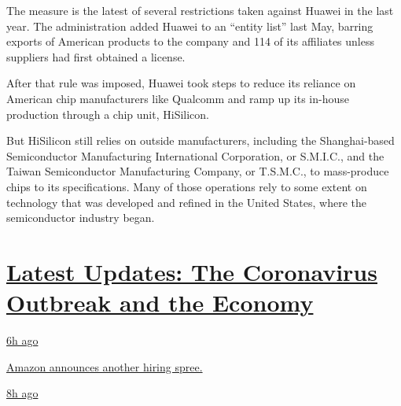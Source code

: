 The measure is the latest of several restrictions taken against Huawei
in the last year. The administration added Huawei to an ``entity list''
last May, barring exports of American products to the company and 114 of
its affiliates unless suppliers had first obtained a license.

After that rule was imposed, Huawei took steps to reduce its reliance on
American chip manufacturers like Qualcomm and ramp up its in-house
production through a chip unit, HiSilicon.

But HiSilicon still relies on outside manufacturers, including the
Shanghai-based Semiconductor Manufacturing International Corporation, or
S.M.I.C., and the Taiwan Semiconductor Manufacturing Company, or
T.S.M.C., to mass-produce chips to its specifications. Many of those
operations rely to some extent on technology that was developed and
refined in the United States, where the semiconductor industry began.

\hypertarget{latest-updates-the-coronavirus-outbreak-and-the-economy}{%
\section{\texorpdfstring{\href{https://www.nytimes3xbfgragh.onion/live/2020/09/09/business/stock-market-today-coronavirus?action=click\&pgtype=Article\&state=default\&region=MAIN_CONTENT_1\&context=storylines_live_updates}{Latest
Updates: The Coronavirus Outbreak and the
Economy}}{Latest Updates: The Coronavirus Outbreak and the Economy}}\label{latest-updates-the-coronavirus-outbreak-and-the-economy}}

\href{https://www.nytimes3xbfgragh.onion/live/2020/09/09/business/stock-market-today-coronavirus?action=click\&pgtype=Article\&state=default\&region=MAIN_CONTENT_1\&context=storylines_live_updates\#amazon-announces-another-hiring-spree}{6h
ago}

\href{https://www.nytimes3xbfgragh.onion/live/2020/09/09/business/stock-market-today-coronavirus?action=click\&pgtype=Article\&state=default\&region=MAIN_CONTENT_1\&context=storylines_live_updates\#amazon-announces-another-hiring-spree}{Amazon
announces another hiring spree.}

\href{https://www.nytimes3xbfgragh.onion/live/2020/09/09/business/stock-market-today-coronavirus?action=click\&pgtype=Article\&state=default\&region=MAIN_CONTENT_1\&context=storylines_live_updates\#why-a-licensing-expert-and-a-mall-operator-bought-brooks-brothers-forever-21-and-others}{8h
ago}

